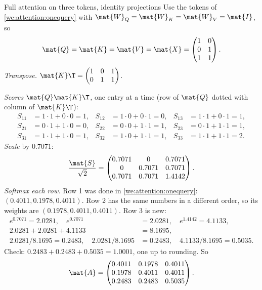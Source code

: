 \begin{worked}[label={we:attention:full}]{Full attention on three tokens, identity projections}
Use the tokens of \cref{we:attention:onequery} with $\mat{W}_Q=\mat{W}_K=\mat{W}_V=\mat{I}$, so
\[
  \mat{Q} = \mat{K} = \mat{V} = \mat{X} =
  \begin{pmatrix} 1 & 0\\ 0 & 1\\ 1 & 1 \end{pmatrix}.
\]
\emph{Transpose.} $\mat{K}\T = \begin{pmatrix} 1 & 0 & 1\\ 0 & 1 & 1\end{pmatrix}$.

\emph{Scores $\mat{Q}\mat{K}\T$,} one entry at a time (row of $\mat{Q}$ dotted with column of
$\mat{K}\T$):
\begin{align*}
  S_{11} &= 1\cdot1 + 0\cdot0 = 1, & S_{12} &= 1\cdot0 + 0\cdot1 = 0, & S_{13} &= 1\cdot1 + 0\cdot1 = 1,\\
  S_{21} &= 0\cdot1 + 1\cdot0 = 0, & S_{22} &= 0\cdot0 + 1\cdot1 = 1, & S_{23} &= 0\cdot1 + 1\cdot1 = 1,\\
  S_{31} &= 1\cdot1 + 1\cdot0 = 1, & S_{32} &= 1\cdot0 + 1\cdot1 = 1, & S_{33} &= 1\cdot1 + 1\cdot1 = 2.
\end{align*}
\emph{Scale} by $0.7071$:
\[
  \frac{\mat{S}}{\sqrt2} = \begin{pmatrix} 0.7071 & 0 & 0.7071\\ 0 & 0.7071 & 0.7071\\ 0.7071 & 0.7071 & 1.4142\end{pmatrix}.
\]
\emph{Softmax each row.} Row 1 was done in \cref{we:attention:onequery}: $(0.4011, 0.1978,
0.4011)$. Row 2 has the same numbers in a different order, so its weights are $(0.1978, 0.4011,
0.4011)$. Row 3 is new:
\begin{align*}
  e^{0.7071} = 2.0281,\quad e^{0.7071} &= 2.0281,\quad e^{1.4142} = 4.1133,\\
  2.0281 + 2.0281 + 4.1133 &= 8.1695,\\
  2.0281/8.1695 = 0.2483,\quad 2.0281/8.1695 &= 0.2483,\quad 4.1133/8.1695 = 0.5035.
\end{align*}
Check: $0.2483 + 0.2483 + 0.5035 = 1.0001$, one up to rounding. So
\[
  \mat{A} = \begin{pmatrix} 0.4011 & 0.1978 & 0.4011\\ 0.1978 & 0.4011 & 0.4011\\ 0.2483 & 0.2483 & 0.5035\end{pmatrix}.
\]
\end{worked}
